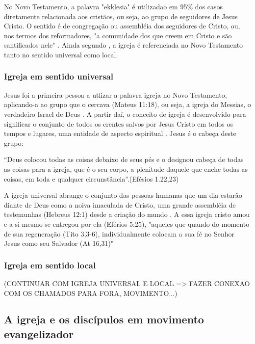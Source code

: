 \documentclass[
	12pt,				%
	openright,			%
	twoside,			%
	a4paper,			%
	english,			%
	french,				%
	spanish,			%
	brazil				%
	]{abntex2}
\begin{document}
No Novo Testamento, a palavra "ekklesia" é utilizadao em 95\% dos casos diretamente relacionada aos cristãos, ou seja, ao grupo de seguidores de Jesus Cristo. O sentido é de congregação ou assembléia dos seguidores de Cristo, ou, nos termos dos reformadores, "a comunidade dos que creem em Cristo e são santificados nele" \cite[318]{zac}. Ainda segundo \cite[318]{zac}, a igreja é referenciada no Novo Testamento tanto no sentido universal como local. 

\subsubsection{Igreja em sentido universal}

Jesus foi a primeira pessoa a utlizar a palavra igreja no Novo Testamento, aplicando-a ao grupo que o cercava (Mateus 11:18), ou seja, a igreja do Messias, o verdadeiro Israel de Deus \cite[911]{berkhof}. A partir daí, o conceito de igreja é desenvolvido para significar o conjunto de todos os crentes salvos por Jesus Cristo em todos os tempos e lugares, uma entidade de aspecto espiritual \cite[318]{zac}. Jesus é o cabeça deste grupo:
\begin{citacao}“Deus colocou todas as coisas debaixo de seus pés e o designou cabeça de todas as coisas para a igreja, que é o seu corpo, a plenitude daquele que enche todas as coisas, em toda e qualquer circunstância”.(Efésios 1.22,23)
\end{citacao}

A igreja universal abrange o conjunto das pessoas humanas que um dia estarão diante de Deus como a noiva imaculada de Cristo, uma grande assembléia de testemunhas (Hebreus 12:1) desde a criação do mundo \cite[607]{bavinck}. A essa igreja cristo amou e a si mesmo se entregou por ela (Eférios 5:25), "aqueles que quando do momento de sua regeneração (Tito 3,3-6), individualmente colocam a sua fé no Senhor Jesus como seu Salvador (At 16,31)" \cite[319]{zac}


\subsubsection{Igreja em sentido local}

(CONTINUAR COM IGREJA UNIVERSAL E LOCAL => FAZER CONEXAO COM OS CHAMADOS PARA FORA, MOVIMENTO...)

\subsection{A igreja e os discípulos em movimento evangelizador}
\end{document}
